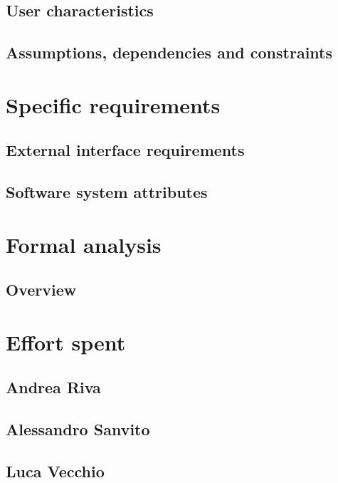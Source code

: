 \documentclass[10pt,english, openany]{book}
\begin{document}


\section{User characteristics}



\section{Assumptions, dependencies and constraints}



\chapter{Specific requirements}

\section{External interface requirements}



\section{Software system attributes}



\chapter{Formal analysis}

\section{Overview}



\chapter{Effort spent}

\section{Andrea Riva}



\section{Alessandro Sanvito}



\section{Luca Vecchio}



\pagebreak
\end{document}
